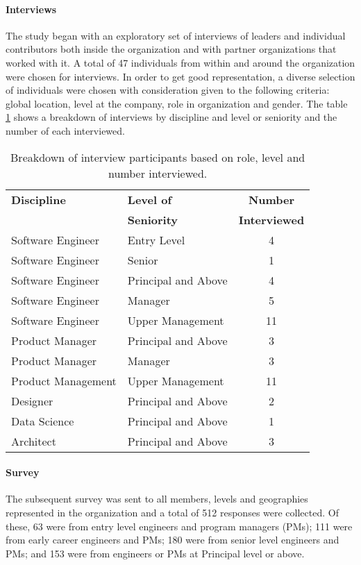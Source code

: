 \documentclass[sigconf, nonacm]{acmart}
\begin{document}
\paragraph{Interviews} The study began with an exploratory set of interviews of leaders and individual contributors both inside the organization and with partner organizations that worked with it.
%
A total of 47 individuals from within and around the organization were chosen for interviews. In order to get good representation, a diverse selection of individuals were chosen with consideration given to the following criteria: global location, level at the company, role in organization and gender. The table \ref{table:1} shows a breakdown of interviews by discipline and level or seniority and the number of each interviewed.

\begin{table}\centering
\caption{Breakdown of interview participants based on role, level and number interviewed. }
\label{table:1}
\begin{tabular} { llc }
 \toprule
 \bf Discipline &  \bf Level of & \bf Number \\
 \bf  & \bf Seniority & \bf Interviewed \\
 \midrule
 Software Engineer  & Entry Level & 4  \\
 Software Engineer  & Senior  & 1 \\
 Software Engineer  & Principal and Above & 4  \\
 Software Engineer  & Manager  & 5  \\
 Software Engineer  & Upper Management  &  11 \\
 \midrule
 Product Manager  & Principal and Above &  3  \\
 Product Manager  & Manager   & 3  \\
 Product Management & Upper Management & 11  \\
 \midrule
 Designer & Principal and Above  & 2  \\
 \midrule
 Data Science & Principal and Above   & 1  \\
 \midrule
 Architect  & Principal and Above  &  3  \\
\bottomrule
\end{tabular}
\end{table}

\paragraph{Survey} The subsequent survey was sent to all members, levels and geographies represented in the organization and a total of 512 responses were collected. Of these, 63 were from entry level engineers and program managers (PMs); 111 were from early career engineers and PMs; 180 were from senior level engineers and PMs; and 153 were from engineers or PMs at Principal level or above. 
\end{document}
